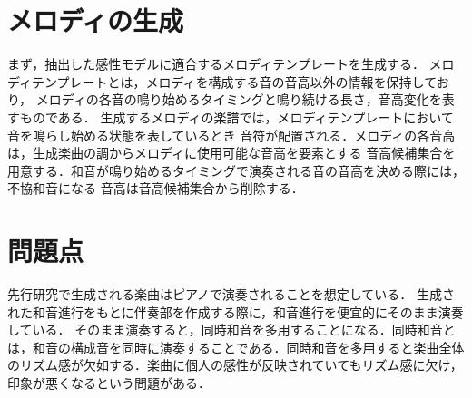 \section{メロディの生成}
まず，抽出した感性モデルに適合するメロディテンプレートを生成する．
メロディテンプレートとは，メロディを構成する音の音高以外の情報を保持しており，
メロディの各音の鳴り始めるタイミングと鳴り続ける長さ，音高変化を表すものである．
生成するメロディの楽譜では，メロディテンプレートにおいて音を鳴らし始める状態を表しているとき
音符が配置される．メロディの各音高は，生成楽曲の調からメロディに使用可能な音高を要素とする
音高候補集合を用意する．和音が鳴り始めるタイミングで演奏される音の音高を決める際には，不協和音になる
音高は音高候補集合から削除する．

\section{問題点}
先行研究で生成される楽曲はピアノで演奏されることを想定している．
生成された和音進行をもとに伴奏部を作成する際に，和音進行を便宜的にそのまま演奏している．
そのまま演奏すると，同時和音を多用することになる．同時和音とは，和音の構成音を同時に演奏することである．同時和音を多用すると楽曲全体のリズム感が欠如する．楽曲に個人の感性が反映されていてもリズム感に欠け，印象が悪くなるという問題がある．


